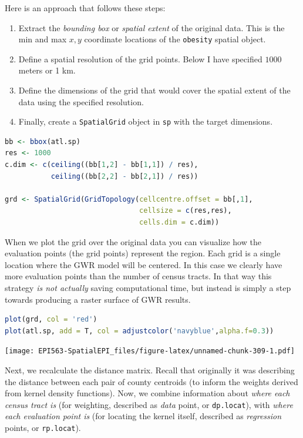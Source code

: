 \documentclass[
]{book}
\newcommand{\passthrough}[1]{#1}
\providecommand{\tightlist}{%
  \setlength{\itemsep}{0pt}\setlength{\parskip}{0pt}}
\begin{document}
Here is an approach that follows these steps:

\begin{enumerate}
\def\labelenumi{\arabic{enumi}.}
\tightlist
\item
  Extract the \emph{bounding box} or \emph{spatial extent} of the original data. This is the min and max \(x,y\) coordinate locations of the \passthrough{\lstinline!obesity!} spatial object.
\item
  Define a spatial resolution of the grid points. Below I have specified \(1000\) meters or 1 km.
\item
  Define the dimensions of the grid that would cover the spatial extent of the data using the specified resolution.
\item
  Finally, create a \passthrough{\lstinline!SpatialGrid!} object in \passthrough{\lstinline!sp!} with the target dimensions.
\end{enumerate}

\begin{lstlisting}[language=R]
bb <- bbox(atl.sp)
res <- 1000
c.dim <- c(ceiling((bb[1,2] - bb[1,1]) / res),
           ceiling((bb[2,2] - bb[2,1]) / res))

grd <- SpatialGrid(GridTopology(cellcentre.offset = bb[,1], 
                                cellsize = c(res,res), 
                                cells.dim = c.dim))
\end{lstlisting}

When we plot the grid over the original data you can visualize how the evaluation points (the grid points) represent the region. Each grid is a single location where the GWR model will be centered. In this case we clearly have more evaluation points than the number of census tracts. In that way this strategy \emph{is not actually} saving computational time, but instead is simply a step towards producing a raster surface of GWR results.

\begin{lstlisting}[language=R]
plot(grd, col = 'red')
plot(atl.sp, add = T, col = adjustcolor('navyblue',alpha.f=0.3))
\end{lstlisting}

\texttt{[image: EPI563-SpatialEPI\_files/figure-latex/unnamed-chunk-309-1.pdf]}

Next, we recalculate the distance matrix. Recall that originally it was describing the distance between each pair of county centroids (to inform the weights derived from kernel density functions). Now, we combine information about \emph{where each census tract is} (for weighting, described as \emph{data} point, or \passthrough{\lstinline!dp.locat!}), with \emph{where each evaluation point is} (for locating the kernel itself, described as \emph{regression} points, or \passthrough{\lstinline!rp.locat!}).
\end{document}
